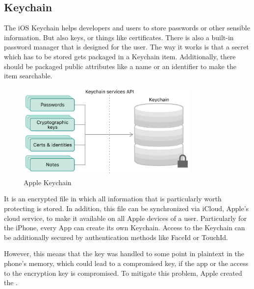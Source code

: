 \documentclass[12pt,oneside,a4paper,parskip]{scrbook}
\begin{document}
\subsection{Keychain}
The iOS Keychain helps developers and users to store passwords or other sensible information. But also keys, or things like certificates. There is also a built-in password manager that is designed for the user. The way it works is that a secret which has to be stored gets packaged in a Keychain item. Additionally, there should be packaged public attributes like a name or an identifier to make the item searchable. 

\begin{figure}[ht]
  \centering
  \includegraphics[width=0.8\textwidth]{ressources/apple_keychain.png}
  \caption{Apple Keychain \parencite{apple_keychain_2020}}
  \label{apple:keychain}
\end{figure}

It is an encrypted file in which all information that is particularly worth protecting is stored. In addition, this file can be synchronized via iCloud, Apple's cloud service, to make it available on all Apple devices of a user. Particularly for the iPhone, every App can create its own Keychain. Access to the Keychain can be additionally secured by authentication methods like FaceId or TouchId.

However, this means that the key was handled to some point in plaintext in the phone's memory, which could lead to a compromised key, if the app or the access to the encryption key is compromised. To mitigate this problem, Apple created the  \parencite{apple_keychain_2020}.


\end{document}
